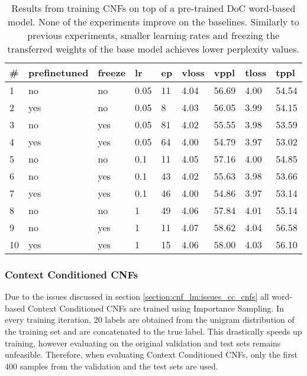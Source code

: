 \begin{table}
\centering
\caption{Results from training CNFs on top of a pre-trained DoC word-based model. None of the experiments improve on the baselines. Similarly to previous experiments, smaller learning rates and freezing the transferred weights of the base model achieves lower perplexity values.}
\begin{tabular}{|l|l|l|l|l|l|l|l|l|}
\hline
\textbf{\#} & \textbf{prefinetuned} & \textbf{freeze} & \textbf{lr} & \textbf{ep} & \textbf{vloss} & \textbf{vppl} & \textbf{tloss} & \textbf{tppl} \\ \hline
1       & no           & no     & 0.05 & 11 & 4.04  & 56.69 & 4.00  & 54.54 \\ \hline
2       & yes          & no     & 0.05 & 8  & 4.03  & 56.05 & 3.99  & 54.15 \\ \hline
3       & no           & yes    & 0.05 & 81 & 4.02  & 55.55 & 3.98  & 53.59 \\ \hline
4       & yes          & yes    & 0.05 & 64 & 4.00  & 54.79 & 3.97  & 53.02 \\ \hline
5       & no           & no     & 0.1  & 11 & 4.05  & 57.16 & 4.00  & 54.85 \\ \hline
6       & no           & yes    & 0.1  & 43 & 4.02  & 55.63 & 3.98  & 53.66 \\ \hline
7       & yes          & yes    & 0.1  & 46 & 4.00  & 54.86 & 3.97  & 53.14 \\ \hline
8       & no           & no     & 1    & 49 & 4.06  & 57.84 & 4.01  & 55.14 \\ \hline
9       & no           & yes    & 1    & 11 & 4.07  & 58.62 & 4.04  & 56.58 \\ \hline
10       & yes          & yes    & 1    & 15 & 4.06  & 58.00 & 4.03  & 56.10 \\ \hline
\end{tabular}
\label{table:experiments:doc_cnf}
\end{table}


\subsubsection{Context Conditioned CNFs}

Due to the issues discussed in section \ref{section:cnf_lm:issues_cc_cnfs} all word-based Context Conditioned CNFs are trained using Importance Sampling. In every training iteration, 20 labels are obtained from the unigram distribution of the training set and are concatenated to the true label. This drastically speeds up training, however evaluating on the original validation and test sets remains unfeasible. Therefore, when evaluating Context Conditioned CNFs, only the first 400 samples from the validation and the test sets are used.

